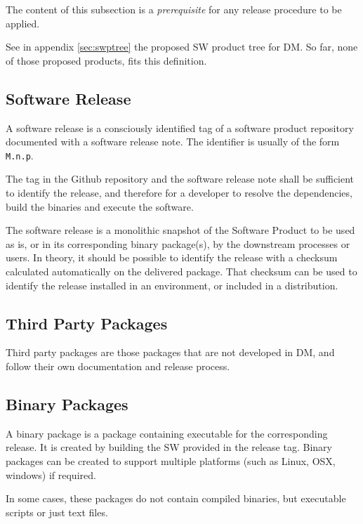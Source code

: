 The content of this subsection is a \textit{prerequisite} for any release procedure to be applied.

See in appendix \ref{sec:swptree} the proposed \gls{SW} product tree for \gls{DM}. So far, none of those proposed products, fits this definition.


\subsection{Software Release} \label{sec:defrelease}

A software release is a consciously identified tag of a software product repository documented with a software release note.
The identifier is usually of the form \texttt{M.n.p}.

The tag in the Github repository and the software release note shall be sufficient to identify the release, and therefore for a developer
to resolve the dependencies, build the binaries and execute the software.

The software release is a monolithic snapshot of the Software Product to be used as is, or in its corresponding binary package(s), by the downstream processes or users.
In theory, it should be possible to identify the release with a checksum calculated automatically on the delivered package.
That checksum can be used to identify the release installed in an environment, or included in a distribution.


\subsection{Third Party Packages}

Third party packages are those packages that are not developed in \gls{DM}, and follow their own documentation and release process.


\subsection{Binary Packages} \label{sec:swbpkg}

A binary package is a package containing executable for the corresponding release.
It is created by building the \gls{SW} provided in the release tag.
Binary packages can be created to support multiple platforms (such as Linux, \gls{OSX}, windows) if required.

In some cases, these packages do not contain compiled binaries, but executable scripts or just text files.


